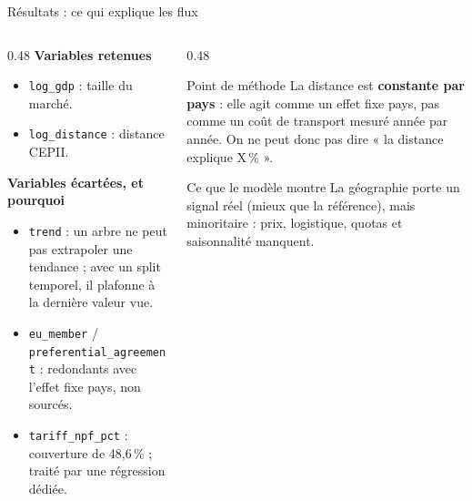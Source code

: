 \documentclass[aspectratio=169,10pt]{beamer}
\begin{document}
\begin{frame}{Résultats : ce qui explique les flux}
  \begin{columns}[T,onlytextwidth]
    \begin{column}{0.48\textwidth}
      \textbf{Variables retenues}
      \begin{itemize}
        \item \texttt{log\_gdp} : taille du marché.
        \item \texttt{log\_distance} : distance CEPII.
      \end{itemize}
      \vspace{0.6em}
      \textbf{Variables écartées, et pourquoi}
      \begin{itemize}
        \item \texttt{trend} : un arbre ne peut pas extrapoler une
              tendance ; avec un split temporel, il plafonne à la dernière
              valeur vue.
        \item \texttt{eu\_member} / \texttt{preferential\_agreement} :
              redondants avec l'effet fixe pays, non sourcés.
        \item \texttt{tariff\_npf\_pct} : couverture de 48,6\,\% ; traité
              par une régression dédiée.
      \end{itemize}
    \end{column}
    \begin{column}{0.48\textwidth}
      \begin{block}{Point de méthode}
        La distance est \textbf{constante par pays} : elle agit comme un
        effet fixe pays, pas comme un coût de transport mesuré année par
        année. On ne peut donc pas dire « la distance explique X\,\% ».
      \end{block}
      \begin{block}{Ce que le modèle montre}
        La géographie porte un signal réel (mieux que la référence), mais
        minoritaire : prix, logistique, quotas et saisonnalité manquent.
      \end{block}
    \end{column}
  \end{columns}
\end{frame}
\end{document}
